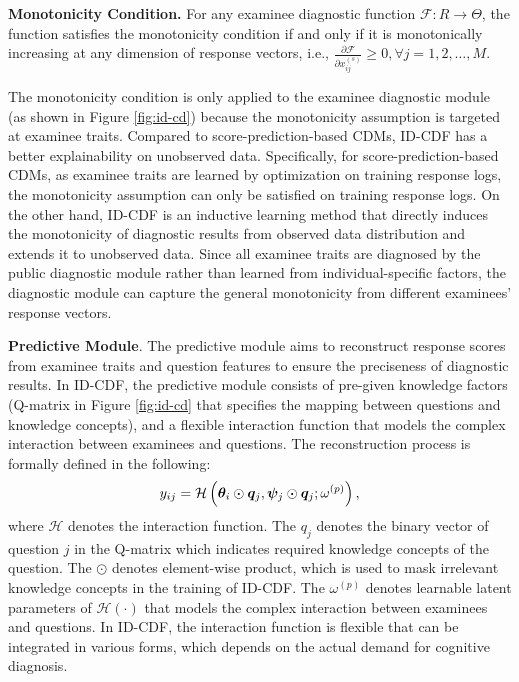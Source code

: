 \documentclass[sigconf]{acmart}
\begin{document}
\begin{definition}
  \textbf{Monotonicity Condition.} For any examinee diagnostic function $\mathcal{F}:R\to\Theta$, the function satisfies the monotonicity condition if and only if it is monotonically increasing at any dimension of response vectors, i.e., $\frac{\partial\mathcal{F}}{\partial x_{ij}^{(s)}}\geq 0, \forall j = 1,2,\ldots,M$.
\end{definition}
\par The monotonicity condition is only applied to the examinee diagnostic module (as shown in Figure \ref{fig:id-cd}) because the monotonicity assumption is targeted at examinee traits. Compared to score-prediction-based CDMs, ID-CDF has a better explainability on unobserved data. Specifically, for score-prediction-based CDMs, as examinee traits are learned by optimization on training response logs, the monotonicity assumption can only be satisfied on training response logs. On the other hand, ID-CDF is an inductive learning method \cite{street1995inductive} that directly induces the monotonicity of diagnostic results from observed data distribution and extends it to unobserved data. Since all examinee traits are diagnosed by the public diagnostic module rather than learned from individual-specific factors, the diagnostic module can capture the general monotonicity from different examinees' response vectors. 

\par \textbf{Predictive Module}. The predictive module aims to reconstruct response scores from examinee traits and question features to ensure the preciseness of diagnostic results. In ID-CDF, the predictive module consists of pre-given knowledge factors (Q-matrix in Figure \ref{fig:id-cd} that specifies the mapping between questions and knowledge concepts), and a flexible interaction function that models the complex interaction between examinees and questions. The reconstruction process is formally defined in the following:
\begin{equation}\label{eq:id-cdf-pm}
  y_{ij} = \mathcal{H}\left(\bm{\theta}_i\odot \bm{q}_j, \bm{\psi}_j\odot\bm{q}_j;\omega^{(p)}\right),
  \vspace{-5pt}
\end{equation}
where $\mathcal{H}$ denotes the interaction function. The $q_j$ denotes the binary vector of question $j$ in the Q-matrix which indicates required knowledge concepts of the question. The $\odot$ denotes element-wise product, which is used to mask irrelevant knowledge concepts in the training of ID-CDF. The $\omega^{(p)}$ denotes learnable latent parameters of $\mathcal{H}(\cdot)$ that models the complex interaction between examinees and questions. In ID-CDF, the interaction function is flexible that can be integrated in various forms, which depends on the actual demand for cognitive diagnosis.
\end{document}
